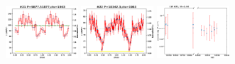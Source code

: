 \documentclass{aastex63}
\begin{document}
\begin{figure}[!ht]
\centering
\includegraphics[angle =0, width = 0.24\textwidth]{./figure/LW/pfold_lc_153001_cut.eps}
\hfill
\includegraphics[angle =0, width = 0.24\textwidth]{./figure/LW/pfold_lc_153002_cut.eps}
\hfill
\includegraphics[angle =0, width = 0.24\textwidth]{./figure/LW/153001_lc_cut.eps}
\hfill
{}
\end{figure}
\end{document}
